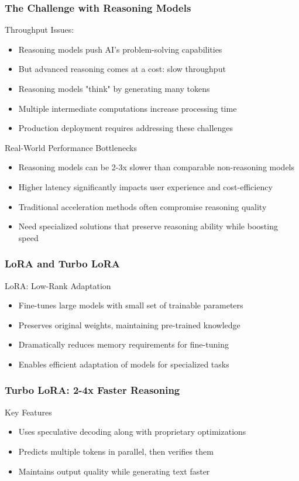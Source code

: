 \documentclass[aspectratio=169]{beamer}
\begin{document}
\begin{frame}
	\frametitle{The Challenge with Reasoning Models}
	\begin{block}{Throughput Issues:}
		\begin{itemize}
			\item Reasoning models push AI's problem-solving capabilities
			\item But advanced reasoning comes at a cost: slow throughput
			\item Reasoning models "think" by generating many tokens
			\item Multiple intermediate computations increase processing time
			\item Production deployment requires addressing these challenges
		\end{itemize}
	\end{block}
	\begin{block}{Real-World Performance Bottlenecks}
		\begin{itemize}
			\item Reasoning models can be 2-3x slower than comparable non-reasoning models
			\item Higher latency significantly impacts user experience and cost-efficiency
			\item Traditional acceleration methods often compromise reasoning quality
			\item Need specialized solutions that preserve reasoning ability while boosting speed
		\end{itemize}
	\end{block}
\end{frame}

\begin{frame}
	\frametitle{LoRA and Turbo LoRA}
	\begin{block}{LoRA: Low-Rank Adaptation}
		\begin{itemize}
			\item Fine-tunes large models with small set of trainable parameters
			\item Preserves original weights, maintaining pre-trained knowledge
			\item Dramatically reduces memory requirements for fine-tuning
			\item Enables efficient adaptation of models for specialized tasks
		\end{itemize}
	\end{block}
\end{frame}

\begin{frame}[shrink=15]
	\frametitle{Turbo LoRA: 2-4x Faster Reasoning}
	\begin{block}{Key Features}
		\begin{itemize}
			\item Uses speculative decoding along with proprietary optimizations
			\item Predicts multiple tokens in parallel, then verifies them
			\item Maintains output quality while generating text faster
		\end{itemize}
	\end{block}
\end{frame}
\end{document}
